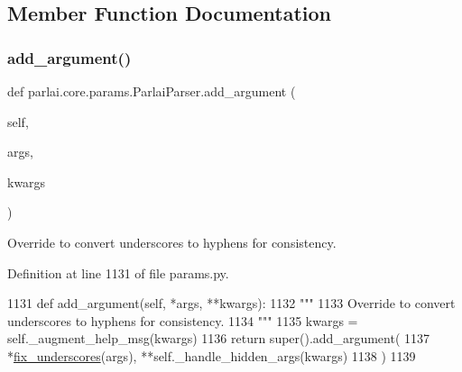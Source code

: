 \subsection{Member Function Documentation}
\mbox{\label{classparlai_1_1core_1_1params_1_1ParlaiParser_a3ecf246ac5ed40769d313a2db962b43e}} 
\subsubsection{\texorpdfstring{add\+\_\+argument()}{add\_argument()}}
{\footnotesize\ttfamily def parlai.\+core.\+params.\+Parlai\+Parser.\+add\+\_\+argument (\begin{DoxyParamCaption}\item[{}]{self,  }\item[{}]{args,  }\item[{}]{kwargs }\end{DoxyParamCaption})}

\begin{DoxyVerb}Override to convert underscores to hyphens for consistency.
\end{DoxyVerb}
 

Definition at line 1131 of file params.\+py.


\begin{DoxyCode}
1131     \textcolor{keyword}{def }add\_argument(self, *args, **kwargs):
1132         \textcolor{stringliteral}{"""}
1133 \textcolor{stringliteral}{        Override to convert underscores to hyphens for consistency.}
1134 \textcolor{stringliteral}{        """}
1135         kwargs = self.\_augment\_help\_msg(kwargs)
1136         \textcolor{keywordflow}{return} super().add\_argument(
1137             *\hyperlink{namespaceparlai_1_1core_1_1params_afe2837a1dc21017be30cc7e3cb3696b8}{fix\_underscores}(args), **self.\_handle\_hidden\_args(kwargs)
1138         )
1139 
\end{DoxyCode}
\mbox{\label{classparlai_1_1core_1_1params_1_1ParlaiParser_a2855a5676bf638bfc9491577e603eee3}} 
